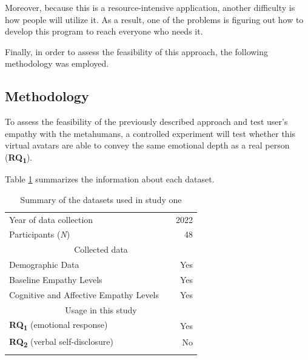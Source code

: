 Moreover, because this is a resource-intensive application, another difficulty is how people will utilize it. As a result, one of the problems is figuring out how to develop this program to reach everyone who needs it. 

Finally, in order to assess the feasibility of this approach, the following methodology was employed.

\subsection{Methodology}
To assess the feasibility of the previously described approach and test user's empathy with the metahumans, a controlled experiment will test whether this virtual avatars are able to convey the same emotional depth as a real person (\textbf{RQ\textsubscript{1}}).


Table \ref{tab:dataset} summarizes the information about each dataset.

\begin{table}[!htb]
    \centering
	\begin{tabular*}{0.8\linewidth}{ @{\extracolsep{\fill}} lcr}
		\hline
		\small Year of data collection  & \small & \small 2022\\
        \small Participants (\textit{N})  & \small & \small 48\\
		\hline
		
        \multicolumn{3}{c}{Collected data}\\
		\small Demographic Data  & \small & \small Yes\\
        \small Baseline Empathy Levels  & \small & \small Yes\\
        \small Cognitive and Affective Empathy Levels  & \small & \small Yes\\
        \hline
		
        \multicolumn{3}{c}{Usage in this study}\\
        \small\textbf{RQ\textsubscript{1}} (emotional response)  & \small & \small Yes\\
        \small\textbf{RQ\textsubscript{2}} (verbal self-disclosure)  & \small & \small No\\
		
		\hline\\
	\end{tabular*}
	\caption{Summary of the datasets used in study one}
	\label{tab:dataset}
\end{table}

